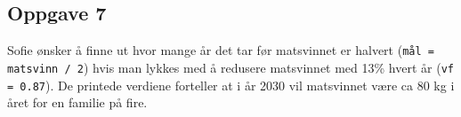 \subsection*{Oppgave 7}
Sofie ønsker å finne ut hvor mange år det tar før matsvinnet er halvert (\texttt{mål = matsvinn / 2}) hvis man lykkes med å redusere matsvinnet med 13\% hvert år (\texttt{vf = 0.87}). De printede verdiene forteller at i år 2030 vil matsvinnet være ca 80 kg i året for en familie på fire.
